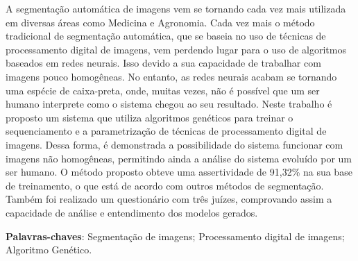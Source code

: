\documentclass[12pt,oneside,a4paper,english,french,spanish,brazil,]{abntex2}
\begin{document}

\frenchspacing 

\imprimircapa
\imprimirfolhaderosto


\begin{resumo}
A segmentação automática de imagens vem se tornando cada vez mais utilizada em diversas áreas como Medicina e Agronomia. Cada vez mais o método tradicional de segmentação automática, que se baseia no uso de técnicas de processamento digital de imagens, vem perdendo lugar para o uso de algoritmos baseados em redes neurais. Isso devido a sua capacidade de trabalhar com imagens pouco homogêneas. No entanto, as redes neurais acabam se tornando uma espécie de caixa-preta, onde, muitas vezes, não é possível que um ser humano interprete como o sistema chegou ao seu resultado. Neste trabalho é proposto um sistema que utiliza algoritmos genéticos para treinar o sequenciamento e a parametrização de técnicas de processamento digital de imagens. Dessa forma, é demonstrada a possibilidade do sistema funcionar com imagens não homogêneas, permitindo ainda a análise do sistema evoluído por um ser humano. O método proposto obteve uma assertividade de 91,32\% na sua base de treinamento, o que está de acordo com outros métodos de segmentação. Também foi realizado um questionário com três juízes, comprovando assim a capacidade de análise e entendimento dos modelos gerados.

\vspace{\onelineskip}
    
 \noindent
 \textbf{Palavras-chaves}: Segmentação de imagens; Processamento digital de imagens; Algoritmo Genético.
\end{resumo}
\end{document}
